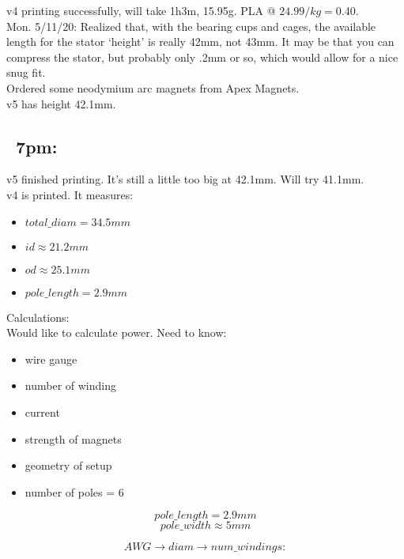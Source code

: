 \documentclass[11pt]{article} %
\begin{document}
\noindent v4 printing successfully, will take 1h3m, 15.95g. PLA @ $24.99/kg = $0.40. \\

\noindent Mon. 5/11/20: Realized that, with the bearing cups and cages, the available length for the stator ‘height’ is really 42mm, not 43mm. It may be that you can compress the stator, but probably only .2mm or so, which would allow for a nice snug fit. \\

\noindent Ordered some neodymium arc magnets from Apex Magnets. \\

\noindent v5 has height 42.1mm. \\

\subsection*{~7pm:} v5 finished printing. It’s still a little too big at 42.1mm. Will try 41.1mm. \\

\noindent  v4 is printed. It measures: \\

\begin{itemize}
\item $total\_diam = 34.5mm$
\item $id \approx 21.2mm$
\item $od \approx 25.1mm$
\item $pole\_length = 2.9mm$
\end{itemize}


\noindent Calculations: \\

\noindent Would like to calculate power. Need to know: \\

\begin{itemize}
\item wire gauge
\item number of winding
\item current
\item strength of magnets
\item geometry of setup
\item number of poles = 6
\end{itemize}

$$pole\_length = 2.9mm$$
$$pole\_width \approx 5mm$$

$$AWG \rightarrow diam \rightarrow num\_windings:$$
\end{document}
